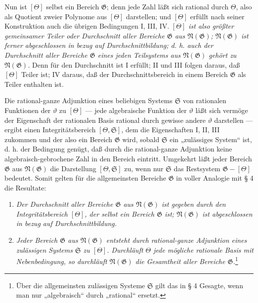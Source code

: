 \documentclass[11pt]{article}
\begin{document}
Nun ist $[\Theta]$ selbst ein Bereich $\mathfrak G$; denn jede Zahl läßt sich
rational durch $\Theta$, also als Quotient zweier Polynome aus $[\Theta]$
darstellen; und $[\Theta]$ erfüllt nach seiner Konstruktion auch die übrigen
Bedingungen I, III, IV. \emph{$[\Theta]$ ist also größter gemeinsamer Teiler
oder Durchschnitt aller Bereiche $\mathfrak G$ aus $\mathfrak N(\mathfrak G)$;
$\mathfrak N(\mathfrak G)$ ist ferner abgeschlossen in bezug auf
Durchschnittbildung; d. h. auch der Durchschnitt aller Bereiche $\mathfrak G$
eines jeden Teilsystems aus $\mathfrak N(\mathfrak G)$ gehört zu
$\mathfrak N(\mathfrak G)$.} Denn für den Durchschnitt ist I erfüllt; II und
III folgen daraus, daß $[\Theta]$ Teiler ist; IV daraus, daß der
Durchschnittsbereich in einem Bereich $\mathfrak G$ als Teiler enthalten ist.

Die rational-ganze Adjunktion eines beliebigen Systems $\mathfrak S$ von
rationalen Funktionen der $\vartheta$ zu $[\Theta]$ --- jede algebraische
Funktion der $\vartheta$ läßt sich vermöge der Eigenschaft der rationalen Basis
rational durch gewisse andere $\vartheta$ darstellen --- ergibt einen
Integritätsbereich $[\Theta,\mathfrak S]$, dem die Eigenschaften I, II, III
zukommen und der also ein Bereich $\mathfrak G$ wird, sobald $\mathfrak S$ ein
„zulässiges System“ ist, d. h. der Bedingung genügt, daß durch die
rational-ganze Adjunktion keine algebraisch-gebrochene Zahl in den Bereich
eintritt. Umgekehrt läßt jeder Bereich $\mathfrak G$ aus
$\mathfrak N(\mathfrak G)$ die Darstellung $[\Theta,\mathfrak S]$ zu, wenn nur
$\mathfrak S$ das Restsystem $\mathfrak G-[\Theta]$ bedeutet. Somit gelten für
die allgemeinsten Bereiche $\mathfrak G$ in voller Analogie mit § 4 die
Resultate:
\begin{enumerate}
\item[a)] \emph{Der Durchschnitt aller Bereiche $\mathfrak G$ aus
$\mathfrak N(\mathfrak G)$ ist gegeben durch den Integritätsbereich $[\Theta]$,
der selbst ein Bereich $\mathfrak G$ ist; $\mathfrak N(\mathfrak G)$ ist
abgeschlossen in bezug auf Durchschnittbildung.}
\item[b)] \emph{Jeder Bereich $\mathfrak G$ aus $\mathfrak N(\mathfrak G)$
entsteht durch rational-ganze Adjunktion eines zulässigen Systems $\mathfrak S$
zu $[\Theta]$. Durchläuft $\Theta$ jede mögliche rationale Basis mit
Nebenbedingung, so durchläuft $\mathfrak N(\mathfrak G)$ die Gesamtheit aller
Bereiche $\mathfrak G$.}\footnote{Über die allgemeinsten zulässigen Systeme
$\mathfrak S$ gilt das in § 4 Gesagte, wenn man nur „algebraisch“ durch
„rational“ ersetzt.}
\end{enumerate}
\end{document}
